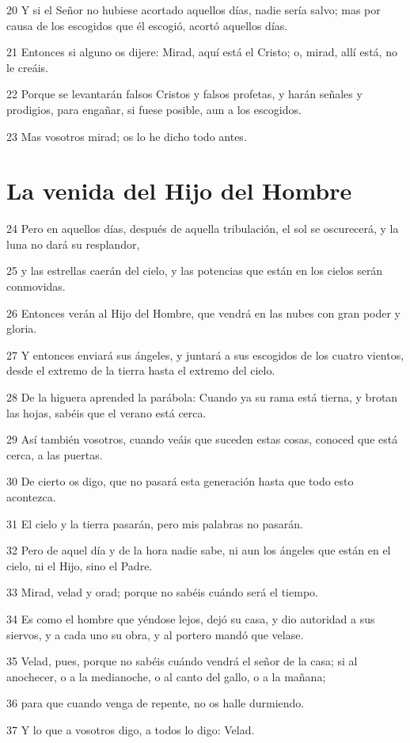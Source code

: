 \par 20 Y si el Señor no hubiese acortado aquellos días, nadie sería salvo; mas por causa de los escogidos que él escogió, acortó aquellos días.
\par 21 Entonces si alguno os dijere: Mirad, aquí está el Cristo; o, mirad, allí está, no le creáis.
\par 22 Porque se levantarán falsos Cristos y falsos profetas, y harán señales y prodigios, para engañar, si fuese posible, aun a los escogidos.
\par 23 Mas vosotros mirad; os lo he dicho todo antes.

\section*{La venida del Hijo del Hombre}

\par 24 Pero en aquellos días, después de aquella tribulación, el sol se oscurecerá, y la luna no dará su resplandor,
\par 25 y las estrellas caerán del cielo, y las potencias que están en los cielos serán conmovidas.
\par 26 Entonces verán al Hijo del Hombre, que vendrá en las nubes con gran poder y gloria.
\par 27 Y entonces enviará sus ángeles, y juntará a sus escogidos de los cuatro vientos, desde el extremo de la tierra hasta el extremo del cielo.
\par 28 De la higuera aprended la parábola: Cuando ya su rama está tierna, y brotan las hojas, sabéis que el verano está cerca.
\par 29 Así también vosotros, cuando veáis que suceden estas cosas, conoced que está cerca, a las puertas.
\par 30 De cierto os digo, que no pasará esta generación hasta que todo esto acontezca.
\par 31 El cielo y la tierra pasarán, pero mis palabras no pasarán.
\par 32 Pero de aquel día y de la hora nadie sabe, ni aun los ángeles que están en el cielo, ni el Hijo, sino el Padre.
\par 33 Mirad, velad y orad; porque no sabéis cuándo será el tiempo.
\par 34 Es como el hombre que yéndose lejos, dejó su casa, y dio autoridad a sus siervos, y a cada uno su obra, y al portero mandó que velase.
\par 35 Velad, pues, porque no sabéis cuándo vendrá el señor de la casa; si al anochecer, o a la medianoche, o al canto del gallo, o a la mañana;
\par 36 para que cuando venga de repente, no os halle durmiendo.
\par 37 Y lo que a vosotros digo, a todos lo digo: Velad.

